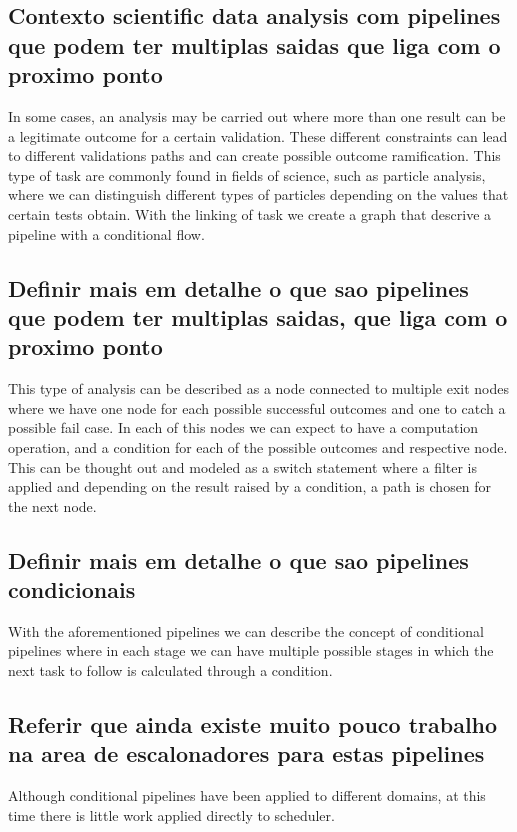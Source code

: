\subsection{Contexto scientific data analysis com pipelines que podem ter multiplas saidas que liga com o proximo ponto}
In some cases, an analysis may be carried out where more than one result can be a legitimate outcome for a certain validation. These different constraints can lead to different validations paths and can create possible outcome ramification. This type of task are commonly found in fields of science, such as particle analysis, where we can distinguish different types of particles depending on the values that certain tests obtain.
With the linking of task we create a graph that descrive a pipeline with a conditional flow.


\subsection{Definir mais em detalhe o que sao pipelines que podem ter multiplas saidas, que liga com o proximo ponto} 
This type of analysis can be described as a node connected to multiple exit nodes where we have one node for each possible successful outcomes and one to catch a possible fail case.
In each of this nodes we can expect to have a computation operation, and  a condition for each of the possible outcomes and respective node.
This can be thought out and modeled as a switch statement where a filter is applied and depending on the result raised by a condition, a path is chosen for the next node. 

\subsection{Definir mais em detalhe o que sao pipelines condicionais}
With the aforementioned pipelines we can describe the concept of conditional pipelines where in each stage we can have multiple possible stages in which the next task to follow is calculated through a condition.

\subsection{Referir que ainda existe muito pouco trabalho na area de escalonadores para estas pipelines}
Although conditional pipelines have been applied to different domains, at this time there is little work applied directly to scheduler.